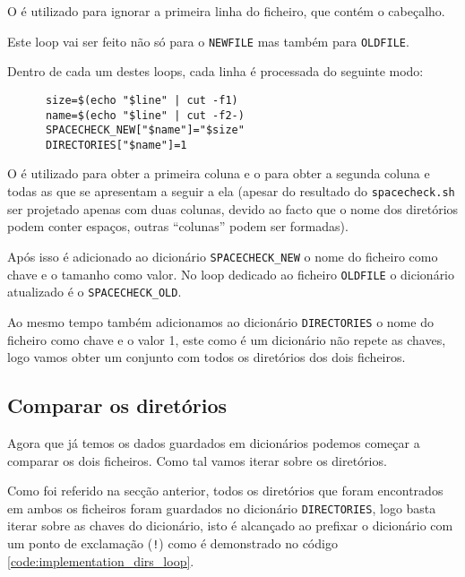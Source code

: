 O  é utilizado para ignorar a primeira linha do ficheiro,
que contém o cabeçalho.

Este loop vai ser feito não só para o \Verb|NEWFILE| mas também para
\Verb|OLDFILE|.

Dentro de cada um destes loops, cada linha é processada do seguinte modo:

\begin{listing}[H]
	\centering
	\begin{verbatim}
      size=$(echo "$line" | cut -f1)
      name=$(echo "$line" | cut -f2-)
      SPACECHECK_NEW["$name"]="$size"
      DIRECTORIES["$name"]=1
  \end{verbatim}
	\cprotect\caption{Processamento de uma linha do resultado do \Verb|spacecheck.sh|}
\end{listing}

O  é utilizado para obter a primeira coluna e o
 para obter a segunda coluna e todas as que se apresentam a
seguir a ela (apesar do resultado do \Verb|spacecheck.sh| ser projetado apenas
com duas colunas, devido ao facto que o nome dos diretórios podem conter
espaços, outras \enquote{colunas} podem ser formadas).

Após isso é adicionado ao dicionário \Verb|SPACECHECK_NEW| o nome do ficheiro
como chave e o tamanho como valor. No loop dedicado ao ficheiro
\Verb|OLDFILE| o dicionário atualizado é o \Verb|SPACECHECK_OLD|.

Ao mesmo tempo também adicionamos ao dicionário \Verb|DIRECTORIES| o nome do
ficheiro como chave e o valor 1, este como é um dicionário não repete as chaves,
logo vamos obter um conjunto com todos os diretórios dos dois ficheiros.

\subsection{Comparar os diretórios}

Agora que já temos os dados guardados em dicionários podemos começar a comparar
os dois ficheiros. Como tal vamos iterar sobre os diretórios.

Como foi referido na secção anterior, todos os diretórios que foram encontrados
em ambos os ficheiros foram guardados no dicionário \Verb|DIRECTORIES|, logo
basta iterar sobre as chaves do dicionário, isto é alcançado ao prefixar o
dicionário com um ponto de exclamação (\Verb|!|) como é demonstrado no código
\ref{code:implementation_dirs_loop}.

